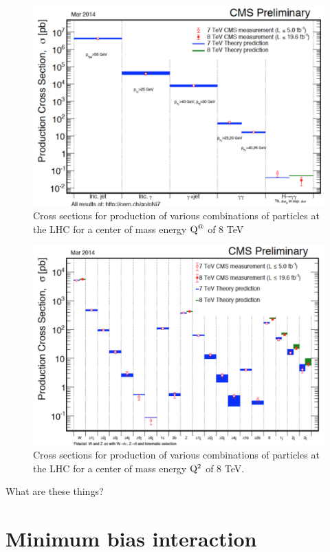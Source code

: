 \begin{figure}[h]
\centering\includegraphics[scale=0.5]{./protonprotoncollisions/Pictures/fig4.pdf}
\caption{Cross sections for production of various combinations of particles at the LHC for a center of mass energy ${\rm Q^@}$ of 8 TeV}
\label{fig:lhcsigma1}
\end{figure}
\begin{figure}[h]
\centering\includegraphics[scale=0.5]{./protonprotoncollisions/Pictures/fig5.pdf}
\caption{Cross sections for production of various combinations of particles at the LHC for a center of mass energy ${\rm Q^2}$ of 8 TeV.}
\label{fig:lhcsigma2}
\end{figure}


What are these things?

\section{Minimum bias interaction}

